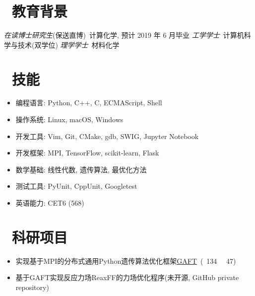 \documentclass{resume}
\begin{document}


 
\section{\faGraduationCap\  教育背景}
\textit{在读博士研究生}(保送直博)\ 计算化学, 预计 2019 年 6 月毕业
\textit{工学学士}\ 计算机科学与技术(双学位)
\textit{理学学士}\ 材料化学

\section{\faCogs\ 技能}
\begin{itemize}[parsep=0.5ex]
  \item 编程语言: Python, C++, C, ECMAScript, Shell
  \item 操作系统: Linux, macOS, Windows
  \item 开发工具: Vim, Git, CMake, gdb, SWIG, Jupyter Notebook
  \item 开发框架: MPI, TensorFlow, scikit-learn, Flask
  \item 数学基础: 线性代数, 遗传算法, 最优化方法
  \item 测试工具: PyUnit, CppUnit, Googletest
  \item 英语能力: CET6 (568)
\end{itemize}

\section{\faUsers\ 科研项目}

\begin{onehalfspacing}
\begin{itemize}
    \item 实现基于MPI的分布式通用Python遗传算法优化框架\faLink \href{https://github.com/PytLab/gaft}{GAFT}\ (\faStar\ 134 \ \faCodeFork\ 47)
    \item 基于GAFT实现反应力场ReaxFF的力场优化程序(未开源, GitHub private repository)
\end{itemize}
\end{onehalfspacing}
\end{document}

